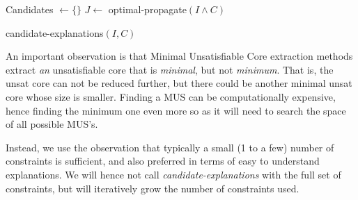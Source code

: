 \begin{algorithm}
% 

% 

  Candidates $\gets \{\}$\;
  $J \gets$ optimal-propagate$(I \wedge C)$\;
\caption{candidate-explanations$(I,C)$}

\label{alg:cand}
\end{algorithm}


An important observation is that Minimal Unsatisfiable Core extraction methods extract \textit{an} unsatisfiable core that is \textit{minimal}, but not \textit{minimum}. That is, the unsat core can not be reduced further, but there could be another minimal unsat core whose size is smaller. Finding a MUS can be computationally expensive, hence finding the minimum one even more so as it will need to search the space of all possible MUS's.



Instead, we use the observation that typically a small (1 to a few) number of constraints is sufficient, and also preferred in terms of easy to understand explanations. We will hence not call \textit{candidate-explanations} with the full set of constraints, but will iteratively grow the number of constraints used. 

